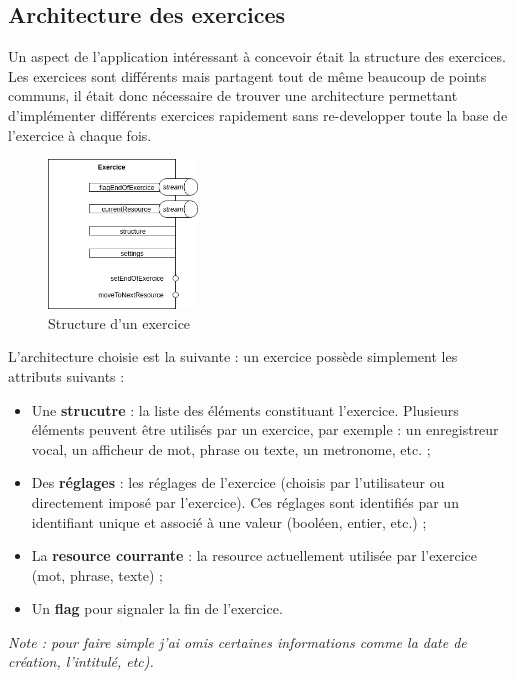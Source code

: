 \subsection{Architecture des exercices}

Un aspect de l'application intéressant à concevoir était la structure des exercices. Les exercices sont différents mais partagent tout de même beaucoup de points communs, il était donc nécessaire de trouver une architecture permettant d'implémenter différents exercices rapidement sans re-developper toute la base de l'exercice à chaque fois.

\begin{figure}[H]
  \includegraphics[width=150px]{content/imgs/exercice.png}
  \caption{Structure d'un exercice}
  \label{fig:exercice}
\end{figure}

L'architecture choisie est la suivante : un exercice possède simplement les attributs suivants :

\begin{itemize}
  \item Une \textbf{strucutre} : la liste des éléments constituant l'exercice. Plusieurs éléments peuvent être utilisés par un exercice, par exemple : un enregistreur vocal, un afficheur de mot, phrase ou texte, un metronome, etc. ;
  \item Des \textbf{réglages} : les réglages de l'exercice (choisis par l'utilisateur ou directement imposé par l'exercice). Ces réglages sont identifiés par un identifiant unique et associé à une valeur (booléen, entier, etc.) ;
  \item La \textbf{resource courrante} : la resource actuellement utilisée par l'exercice (mot, phrase, texte) ;
  \item Un \textbf{flag} pour signaler la fin de l'exercice.
\end{itemize}

\textit{Note : pour faire simple j'ai omis certaines informations comme la date de création, l'intitulé, etc).}

